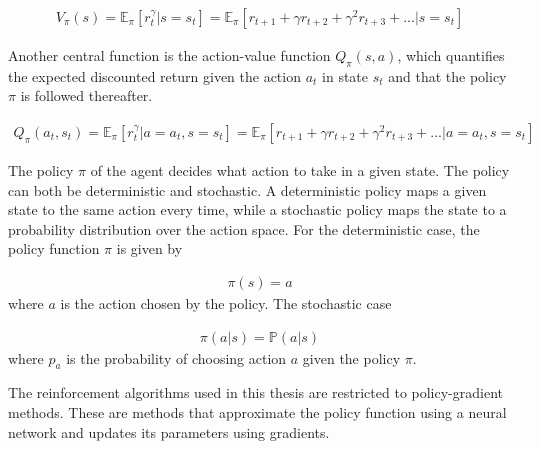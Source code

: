\documentclass[class=book, crop=false]{standalone}
\begin{document}
\begin{equation}
   \begin{aligned}\label{eq:theory:value_function}
V_{\pi}(s) 
= \mathbb{E}_{\pi}[r^{\gamma}_{t}| s=s_{t}]
= \mathbb{E}_{\pi}[ r_{t+1} + \gamma r_{t+2} + \gamma^{2} r_{t+3} + ...|s=s_{t}]
\end{aligned} 
\end{equation}

Another central function is the action-value function $Q_{\pi}(s,a)$, which quantifies the expected discounted return given the action $a_{t}$ in state $s_{t}$ and that the policy $\pi$ is followed thereafter. 

\begin{equation}
   \begin{aligned}\label{eq:theory:action_value_function}
Q_{\pi}(a_{t},s_{t}) 
= \mathbb{E}_{\pi}[r^{\gamma}_{t}|a=a_{t} ,s=s_{t}]
= \mathbb{E}_{\pi}[ r_{t+1} + \gamma r_{t+2} + \gamma^{2} r_{t+3} + ...|a=a_{t} ,s=s_{t}]
\end{aligned} 
\end{equation}

The policy $\pi$ of the agent decides what action to take in a given state. The policy can both be deterministic and stochastic. A deterministic policy maps a given state to the same action every time, while a stochastic policy maps the state to a probability distribution over the action space. For the deterministic case, the policy function $\pi$ is given by


\begin{equation}
   \begin{aligned}\label{eq:theory:policy_function_deterministic}
\pi(s) = a
\end{aligned} 
\end{equation}
where $a$ is the action chosen by the policy. The stochastic case 


\begin{equation}
   \begin{aligned}\label{eq:theory:policy_function_stochastic}
\pi(a|s) = \mathbb{P}(a|s)
\end{aligned} 
\end{equation}
where $p_{a}$ is the probability of choosing action $a$ given the policy $\pi$.


The reinforcement algorithms used in this thesis are restricted to policy-gradient methods. These are methods that approximate the policy function using a neural network and updates its parameters using gradients. 
\end{document}
